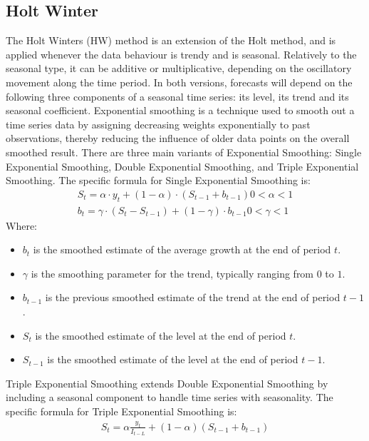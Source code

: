 \documentclass[conference]{IEEEtran}
\begin{document}
\subsection{Holt Winter}
The Holt Winters (HW) method is an extension of the Holt method, and is applied whenever the data behaviour is trendy and is seasonal. Relatively to the seasonal type, it can be additive or multiplicative, depending on the oscillatory movement along the time period. In both versions, forecasts will depend on the following three components of a seasonal time series: its level, its trend and its seasonal coefficient. \cite{HoltWinter1} Exponential smoothing is a technique used to smooth out a time series data by assigning decreasing weights exponentially to past observations, thereby reducing the influence of older data points on the overall smoothed result.
There are three main variants of Exponential Smoothing: Single Exponential Smoothing, Double Exponential Smoothing, and Triple Exponential Smoothing.
The specific formula for Single Exponential Smoothing is: \cite{HoltWinter2}
\begin{align*}
S_t = \alpha \cdot y_t + (1 - \alpha) \cdot (S_{t-1} + b_{t-1}) 0 < α < 1
\\
b_t = \gamma \cdot (S_t - S_{t-1}) + (1 - \gamma) \cdot b_{t-1} 0 < γ < 1 
\end{align*}
Where: 
\begin{itemize}
\item $b_t$ is the smoothed estimate of the average growth at the end of period $t$.
\item $\gamma$ is the smoothing parameter for the trend, typically ranging from $0$ to $1$.
\item $b_{t-1}$ is the previous smoothed estimate of the trend at the end of period $t-1$.
\item $S_t$ is the smoothed estimate of the level at the end of period $t$.
\item $S_{t-1}$ is the smoothed estimate of the level at the end of period $t-1$.
\end{itemize}

Triple Exponential Smoothing extends Double Exponential Smoothing by including a seasonal component to handle time series with seasonality. The specific formula for Triple Exponential Smoothing is: \cite{HoltWinter3}
\begin{align*}
    S_t = \alpha \frac{y_t}{I_{t-L}} + (1-\alpha)(S_{t-1}+b_{t-1}) 
\end{align*}
\end{document}
